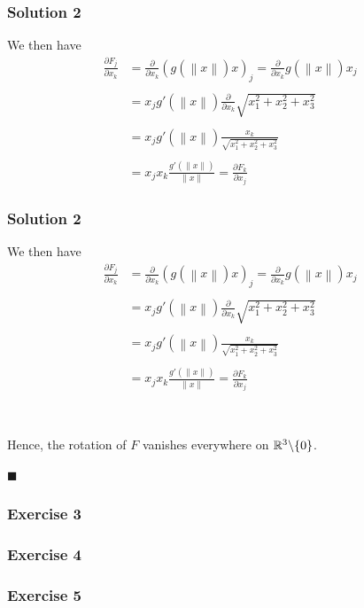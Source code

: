 \documentclass[10pt, t, allowdisplaybreaks]{beamer}
\newcommand{\myqed}{\hfill$\blacksquare$}
\newcommand{\nullspacesmall}{~\vspace{1em}}
\begin{document}
\begin{frame}
    \frametitle{Solution 2}
    We then have 
    \begin{equation*}
        \begin{split}
            \frac{\partial F_j}{\partial x_k} &= \frac{\partial}{\partial x_k}\left(g(\left\lVert x\right\rVert )x\right)_j
            = \frac{\partial}{\partial x_k}g(\left\lVert x\right\rVert )x_j\\\\
            &= x_j g'(\left\lVert x\right\rVert )\frac{\partial }{\partial x_k}\sqrt{x_1^2+x_2^2+x_3^2} \\\\
            &= x_j g'(\left\lVert x\right\rVert )\frac{x_k}{\sqrt{x_1^2+x_2^2+x_3^2}} \\\\
            &= x_j x_k \frac{g'(\left\lVert x\right\rVert )}{\left\lVert x\right\rVert } = \frac{\partial F_k}{\partial x_j}
        \end{split}
    \end{equation*}
\end{frame}
\begin{frame}
    \frametitle{Solution 2}
    We then have 
    \begin{equation*}
        \begin{split}
            \frac{\partial F_j}{\partial x_k} &= \frac{\partial}{\partial x_k}\left(g(\left\lVert x\right\rVert )x\right)_j
            = \frac{\partial}{\partial x_k}g(\left\lVert x\right\rVert )x_j\\\\
            &= x_j g'(\left\lVert x\right\rVert )\frac{\partial }{\partial x_k}\sqrt{x_1^2+x_2^2+x_3^2} \\\\
            &= x_j g'(\left\lVert x\right\rVert )\frac{x_k}{\sqrt{x_1^2+x_2^2+x_3^2}} \\\\
            &= x_j x_k \frac{g'(\left\lVert x\right\rVert )}{\left\lVert x\right\rVert } = \frac{\partial F_k}{\partial x_j}
        \end{split}
    \end{equation*}

    \nullspacesmall

    \par Hence, the rotation of $F$ vanishes everywhere on $\mathbb{R}^3\backslash\{0\}$.

    \myqed

\end{frame}

\begin{frame}
    \frametitle{Exercise 3}

\end{frame}

\begin{frame}
    \frametitle{Exercise 4}

\end{frame}

\begin{frame}
    \frametitle{Exercise 5}

\end{frame}
\end{document}
